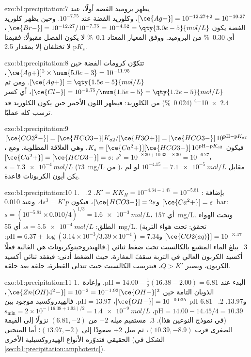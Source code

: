 \begin{solution}{exo:b1:precipitation:7}
يظهر بروميد الفضة أولًا، عند $[\ce{Ag+}] = 10^{-12.27 + 2} =
10^{-10.27}$، وكلوريد الفضة عند $10^{-7.75}$. وحين يظهر كلوريد الفضة
يكون $[\ce{Br-}] = 10^{-12.27}/10^{-7.75} = 10^{-4.52} =
\qty{3.0e-5}{mol/L}$، أي \qty{0.30}{\percent} من البروميد. ووفق المعيار
المعتاد \qty{0.1}{\percent} لا يكون الفصل مقبولًا: فقيمتا
$\mathrm{p}K_s$ لا تختلفان إلا بمقدار 2.5.
\end{solution}

\begin{solution}{exo:b1:precipitation:8}
تتكوّن كرومات الفضة حين $[\ce{Ag+}]^2 \times \num{5.0e-3} = 10^{-11.95}$،
$[\ce{Ag+}] = \qty{1.5e-5}{mol/L}$. ومن ثم $[\ce{Cl-}] = 10^{-9.75}/\num{1.5e-5}
= \qty{1.2e-5}{mol/L}$، أي كسر \num{2.4e-4} (\qty{0.024}{\percent}) من
الكلوريد: فيظهر اللون الأحمر حين يكون الكلوريد قد ترسب
كله عمليًا.
\end{solution}

\begin{solution}{exo:b1:precipitation:9}
$[\ce{CO3^2-}] = [\ce{HCO3-}]K_{a2}/[\ce{H3O+}] = [\ce{HCO3-}]\,10^{\mathrm{pH}
- \mathrm{p}K_{a2}}$، فيكون $K_s = [\ce{Ca^2+}][\ce{HCO3-}]\,10^{\mathrm{pH} -
\mathrm{p}K_{a2}}$، وهي العلاقة المطلوبة. ومع $[\ce{Ca^2+}] =
[\ce{HCO3-}] = s$: $s^2 = 10^{-8.30 + 10.33 - 8.30} = 10^{-6.27}$،
$s = \qty{7.3e-4}{mol/L}$ (\qty{73}{mg/L} من )، مقابل
$10^{-4.15} = \qty{7.1e-5}{mol/L}$ لو لم يكن أيون الكربونات قاعدة.
\end{solution}

\begin{solution}{exo:b1:precipitation:10}
1.~بإضافة : $K' = K K_H = 10^{-4.34 - 1.47} =
10^{-5.81}$.
2.~$[\ce{Ca^2+}] = s$ و$[\ce{HCO3-}] = 2s$، فيكون $4s^3 = K'p$. وعند
\qty{0.010}{bar}: $s = (10^{-5.81} \times 0.010/4)^{1/3} =
\qty{1.6e-3}{mol/L}$، أي \qty{157}{mg/L}. وتحت الهواء الطلق:
$s = \qty{5.5e-4}{mol/L}$، أي \qty{55}{mg/L}. (تحقق: تحت هواء التربة
$[\ce{CO2(aq)}] = 10^{-3.47}$ و$\mathrm{pH} = 6.37 + \log(3.14\times
10^{-3}/3.39 \times 10^{-4}) = 7.34$: فالهيدروجينوكربونات هي الغالبة فعلًا.)
3.~يبلغ الماء المشبع بالكالسيت تحت ضغط ثنائي أكسيد الكربون العالي في
التربة سقفَ المغارة، حيث الضغط أدنى: فيفقد
ثنائي أكسيد الكربون، ويصير $Q > K'$، فيترسب الكالسيت حيث تتدلى القطرة،
حلقة بعد حلقة.
\end{solution}

\begin{solution}{exo:b1:precipitation:11}
1.~البدء عند $\mathrm{pH} = 14.00 - \frac12(16.38 - 2.00) = 6.81$. وإعادة
الذوبان التامة حين $[\ce{Zn(OH)4^2-}] = 10^{-2} = 10^{-1.93}[\ce{OH-}]^2$،
$[\ce{OH-}] = 10^{-0.035}$، $\mathrm{pH} = 13.97$. فالهيدروكسيد موجود
بين pH 6.81 و13.97.
2.~$\mathrm{pH} = 14.00 - 14.45/4 = 10.39$، $s_{\min} = 2 \times
10^{-(16.38 + 1.93)/2} = \qty{1.4e-9}{mol/L}$ (في نموذج النوعين هذا).
3.~مستقيم ميله $-2$ من $(6.81, -2)$ نزولًا إلى القيمة الصغرى قرب
$(10.39, -8.9)$، ثم ميل $+2$ صعودًا إلى $(13.97, -2)$؛ أما المنحنى الحقيقي
فتدوّره الأنواع الهيدروكسيلية الأخرى
(الشكل في \cref{sec:b1:precipitation:amphoteric}).
\end{solution}

